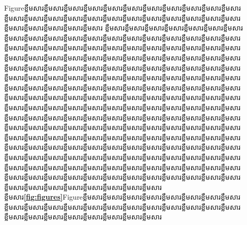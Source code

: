 \documentclass[a4paper,12pt,twoside]{book}
\theoremstyle{plain}
\theoremstyle{definition}
\theoremstyle{remark}
\begin{document}
  Figureខ្លឹមសារខ្លឹមសារខ្លឹមសារខ្លឹមសារខ្លឹមសារខ្លឹមសារខ្លឹមសារខ្លឹមសារខ្លឹមសារខ្លឹមសារខ្លឹមសារខ្លឹមសារខ្លឹមសារខ្លឹមសារខ្លឹមសារខ្លឹមសារខ្លឹមសារខ្លឹមសារខ្លឹមសារខ្លឹមសារខ្លឹមសារខ្លឹមសារខ្លឹមសារខ្លឹមសារខ្លឹមសារខ្លឹមសារខ្លឹមសារខ្លឹមសារ ខ្លឹមសារខ្លឹមសារខ្លឹមសារខ្លឹមសារខ្លឹមសារខ្លឹមសារខ្លឹមសារខ្លឹមសារខ្លឹមសារខ្លឹមសារខ្លឹមសារខ្លឹមសារខ្លឹមសារខ្លឹមសារខ្លឹមសារខ្លឹមសារខ្លឹមសារខ្លឹមសារខ្លឹមសារខ្លឹមសារខ្លឹមសារខ្លឹមសារខ្លឹមសារខ្លឹមសារខ្លឹមសារខ្លឹមសារខ្លឹមសារខ្លឹមសារខ្លឹមសារខ្លឹមសារខ្លឹមសារខ្លឹមសារខ្លឹមសារខ្លឹមសារខ្លឹមសារខ្លឹមសារខ្លឹមសារខ្លឹមសារខ្លឹមសារខ្លឹមសារខ្លឹមសារខ្លឹមសារខ្លឹមសារខ្លឹមសារខ្លឹមសារខ្លឹមសារខ្លឹមសារខ្លឹមសារខ្លឹមសារខ្លឹមសារខ្លឹមសារខ្លឹមសារខ្លឹមសារខ្លឹមសារខ្លឹមសារខ្លឹមសារខ្លឹមសារខ្លឹមសារខ្លឹមសារខ្លឹមសារខ្លឹមសារខ្លឹមសារខ្លឹមសារខ្លឹមសារខ្លឹមសារខ្លឹមសារខ្លឹមសារខ្លឹមសារខ្លឹមសារខ្លឹមសារខ្លឹមសារខ្លឹមសារខ្លឹមសារខ្លឹមសារខ្លឹមសារខ្លឹមសារខ្លឹមសារខ្លឹមសារខ្លឹមសារខ្លឹមសារខ្លឹមសារខ្លឹមសារខ្លឹមសារខ្លឹមសារខ្លឹមសារខ្លឹមសារខ្លឹមសារខ្លឹមសារខ្លឹមសារខ្លឹមសារខ្លឹមសារខ្លឹមសារខ្លឹមសារខ្លឹមសារខ្លឹមសារខ្លឹមសារខ្លឹមសារខ្លឹមសារខ្លឹមសារខ្លឹមសារខ្លឹមសារខ្លឹមសារខ្លឹមសារខ្លឹមសារខ្លឹមសារខ្លឹមសារខ្លឹមសារខ្លឹមសារខ្លឹមសារខ្លឹមសារខ្លឹមសារខ្លឹមសារខ្លឹមសារខ្លឹមសារខ្លឹមសារខ្លឹមសារខ្លឹមសារខ្លឹមសារខ្លឹមសារខ្លឹមសារខ្លឹមសារខ្លឹមសារខ្លឹមសារខ្លឹមសារខ្លឹមសារខ្លឹមសារខ្លឹមសារខ្លឹមសារខ្លឹមសារខ្លឹមសារខ្លឹមសារខ្លឹមសារខ្លឹមសារខ្លឹមសារខ្លឹមសារខ្លឹមសារខ្លឹមសារខ្លឹមសារខ្លឹមសារខ្លឹមសារខ្លឹមសារខ្លឹមសារខ្លឹមសារខ្លឹមសារខ្លឹមសារខ្លឹមសារខ្លឹមសារខ្លឹមសារខ្លឹមសារខ្លឹមសារខ្លឹមសារខ្លឹមសារខ្លឹមសារខ្លឹមសារខ្លឹមសារខ្លឹមសារខ្លឹមសារខ្លឹមសារខ្លឹមសារខ្លឹមសារខ្លឹមសារខ្លឹមសារខ្លឹមសារខ្លឹមសារខ្លឹមសារខ្លឹមសារខ្លឹមសារខ្លឹមសារខ្លឹមសារខ្លឹមសារខ្លឹមសារខ្លឹមសារខ្លឹមសារខ្លឹមសារខ្លឹមសារខ្លឹមសារខ្លឹមសារខ្លឹមសារខ្លឹមសារខ្លឹមសារខ្លឹមសារខ្លឹមសារខ្លឹមសារខ្លឹមសារខ្លឹមសារខ្លឹមសារខ្លឹមសារខ្លឹមសារខ្លឹមសារខ្លឹមសារខ្លឹមសារខ្លឹមសារខ្លឹមសារខ្លឹមសារខ្លឹមសារខ្លឹមសារ{\textbf{\cref*{fig:figures}}}Figureខ្លឹមសារខ្លឹមសារខ្លឹមសារខ្លឹមសារខ្លឹមសារខ្លឹមសារខ្លឹមសារខ្លឹមសារខ្លឹមសារខ្លឹមសារខ្លឹមសារខ្លឹមសារខ្លឹមសារខ្លឹមសារខ្លឹមសារខ្លឹមសារខ្លឹមសារខ្លឹមសារខ្លឹមសារខ្លឹមសារខ្លឹមសារខ្លឹមសារខ្លឹមសារខ្លឹមសារខ្លឹមសារខ្លឹមសារខ្លឹមសារខ្លឹមសារ 
\end{document}

